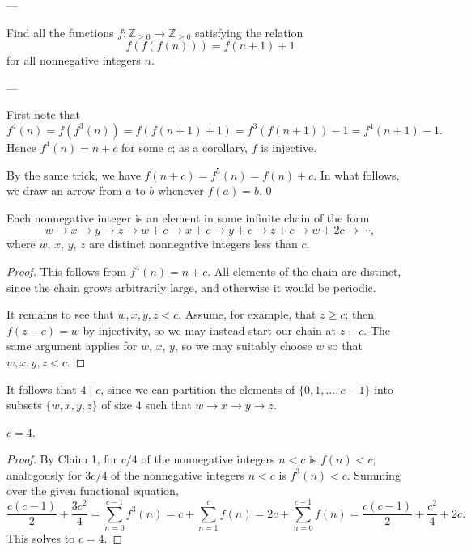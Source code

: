 
---

Find all the functions $f:\mathbb Z_{\ge0}\to\mathbb Z_{\ge0}$ satisfying the relation \[f(f(f(n)))=f(n+1)+1\]
for all nonnegative integers $n$.

---

First note that \[f^4(n)=f\left(f^3(n)\right)=f(f(n+1)+1)=f^3(f(n+1))-1=f^4(n+1)-1.\]
Hence $f^4(n)=n+c$ for some $c$; as a corollary, $f$ is injective.

By the same trick, we have $f(n+c)=f^5(n)=f(n)+c$. In what follows, we draw an arrow from $a$ to $b$ whenever $f(a)=b$.
\setcounter{iclaim}0
\begin{iclaim}
    Each nonnegative integer is an element in some infinite chain of the form \[w\to x\to y\to z\to w+c\to x+c\to y+c\to z+c\to w+2c\to\cdots,\]
    where $w$, $x$, $y$, $z$ are distinct nonnegative integers less than $c$.
\end{iclaim}
\begin{proof}
    This follows from $f^4(n)=n+c$. All elements of the chain are distinct, since the chain grows arbitrarily large, and otherwise it would be periodic.

    It remains to see that $w,x,y,z<c$. Assume, for example, that $z\ge c$; then $f(z-c)=w$ by injectivity, so we may instead start our chain at $z-c$. The same argument applies for $w$, $x$, $y$, so we may suitably choose $w$ so that $w,x,y,z<c$.
\end{proof}

It follows that $4\mid c$, since we can partition the elements of $\{0,1,\ldots,c-1\}$ into subsets $\{w,x,y,z\}$ of size $4$ such that $w\to x\to y\to z$.
\begin{iclaim}
    $c=4$.
\end{iclaim}
\begin{proof}
    By Claim 1, for $c/4$ of the nonnegative integers $n<c$ is $f(n)<c$; analogously for $3c/4$ of the nonnegative integers $n<c$ is $f^3(n)<c$. Summing over the given functional equation, \[\frac{c(c-1)}2+\frac{3c^2}4=\sum_{n=0}^{c-1}f^3(n)=c+\sum_{n=1}^cf(n)=2c+\sum_{n=0}^{c-1}f(n)=\frac{c(c-1)}2+\frac{c^2}4+2c.\]
    This solves to $c=4$.
\end{proof}

